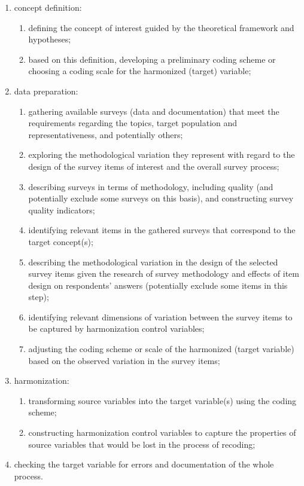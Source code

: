 \documentclass[12pt,]{article}
\providecommand{\tightlist}{%
  \setlength{\itemsep}{0pt}\setlength{\parskip}{0pt}}
\begin{document}
\begin{enumerate}
\def\labelenumi{(\arabic{enumi})}
\tightlist
\item
  concept definition:

  \begin{enumerate}
  \def\labelenumii{\alph{enumii}.}
  \tightlist
  \item
    defining the concept of interest guided by the theoretical framework and hypotheses;
  \item
    based on this definition, developing a preliminary coding scheme or choosing a coding scale for the harmonized (target) variable;
  \end{enumerate}
\item
  data preparation:

  \begin{enumerate}
  \def\labelenumii{\alph{enumii}.}
  \tightlist
  \item
    gathering available surveys (data and documentation) that meet the requirements regarding the topics, target population and representativeness, and potentially others;
  \item
    exploring the methodological variation they represent with regard to the design of the survey items of interest and the overall survey process;
  \item
    describing surveys in terms of methodology, including quality (and potentially exclude some surveys on this basis), and constructing survey quality indicators;
  \item
    identifying relevant items in the gathered surveys that correspond to the target concept(s);
  \item
    describing the methodological variation in the design of the selected survey items given the research of survey methodology and effects of item design on respondents' answers (potentially exclude some items in this step);
  \item
    identifying relevant dimensions of variation between the survey items to be captured by harmonization control variables;
  \item
    adjusting the coding scheme or scale of the harmonized (target variable) based on the observed variation in the survey items;
  \end{enumerate}
\item
  harmonization:

  \begin{enumerate}
  \def\labelenumii{\alph{enumii}.}
  \tightlist
  \item
    transforming source variables into the target variable(s) using the coding scheme;
  \item
    constructing harmonization control variables to capture the properties of source variables that would be lost in the process of recoding;
  \end{enumerate}
\item
  checking the target variable for errors and documentation of the whole process.
\end{enumerate}
\end{document}

